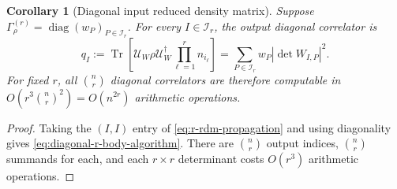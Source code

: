 \documentclass[10pt,twocolumn]{article}
\theoremstyle{plain}
\newtheorem{corollary}[proposition]{Corollary}
\begin{document}
\begin{corollary}[Diagonal input reduced density matrix]
\label{cor:diagonal-r-rdm}
Suppose
\(\Gamma_\rho^{(r)}=\operatorname{diag}(w_P)_{P\in\mathcal I_r}\).
For every \(I\in\mathcal I_r\), the output diagonal correlator is
\begin{equation}
q_I
:=
\operatorname{Tr}\!\left[
\mathcal U_W\rho\mathcal U_W^\dagger
\prod_{\ell=1}^r n_{i_\ell}
\right]
=
\sum_{P\in\mathcal I_r}
w_P\left|\det W_{I,P}\right|^2.
\label{eq:diagonal-r-body-algorithm}
\end{equation}
For fixed \(r\), all \(\binom nr\) diagonal correlators are therefore
computable in
\(O(r^3\binom nr^2)=O(n^{2r})\) arithmetic operations.
\end{corollary}

\begin{proof}
Taking the \((I,I)\) entry of
\eqref{eq:r-rdm-propagation} and using diagonality gives
\eqref{eq:diagonal-r-body-algorithm}. There are \(\binom nr\) output
indices, \(\binom nr\) summands for each, and each \(r\times r\)
determinant costs \(O(r^3)\) arithmetic operations.
\end{proof}
\end{document}
